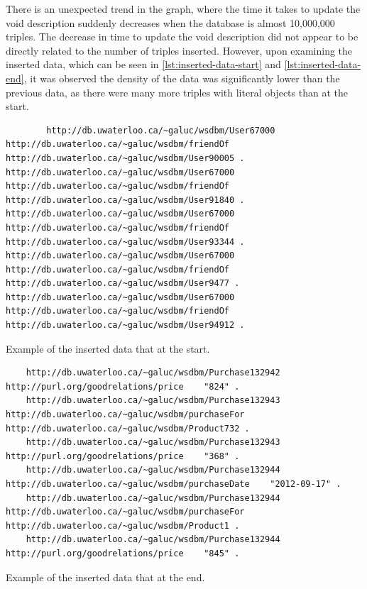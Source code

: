 There is an unexpected trend in the graph, where the time it takes to update the \gls{void} description suddenly decreases when the database is almost 10,000,000 triples. The decrease in time to update the \gls{void} description did not appear to be directly related to the number of triples inserted. However, upon examining the inserted data, which can be seen in \autoref{lst:inserted-data-start} and \autoref{lst:inserted-data-end}, it was observed the density of the data was significantly lower than the previous data, as there were many more triples with literal objects than at the start.

\begin{listing}
    \begin{verbatim}
        http://db.uwaterloo.ca/~galuc/wsdbm/User67000    http://db.uwaterloo.ca/~galuc/wsdbm/friendOf    http://db.uwaterloo.ca/~galuc/wsdbm/User90005 .
http://db.uwaterloo.ca/~galuc/wsdbm/User67000    http://db.uwaterloo.ca/~galuc/wsdbm/friendOf    http://db.uwaterloo.ca/~galuc/wsdbm/User91840 .
http://db.uwaterloo.ca/~galuc/wsdbm/User67000    http://db.uwaterloo.ca/~galuc/wsdbm/friendOf    http://db.uwaterloo.ca/~galuc/wsdbm/User93344 .
http://db.uwaterloo.ca/~galuc/wsdbm/User67000    http://db.uwaterloo.ca/~galuc/wsdbm/friendOf    http://db.uwaterloo.ca/~galuc/wsdbm/User9477 .
http://db.uwaterloo.ca/~galuc/wsdbm/User67000    http://db.uwaterloo.ca/~galuc/wsdbm/friendOf    http://db.uwaterloo.ca/~galuc/wsdbm/User94912 .
\end{verbatim}
    \caption{Example of the inserted data that at the start.}
    \label{lst:inserted-data-start}
\end{listing}

\begin{listing}
    \begin{verbatim}
    http://db.uwaterloo.ca/~galuc/wsdbm/Purchase132942    http://purl.org/goodrelations/price    "824" .
    http://db.uwaterloo.ca/~galuc/wsdbm/Purchase132943    http://db.uwaterloo.ca/~galuc/wsdbm/purchaseFor    http://db.uwaterloo.ca/~galuc/wsdbm/Product732 .
    http://db.uwaterloo.ca/~galuc/wsdbm/Purchase132943    http://purl.org/goodrelations/price    "368" .
    http://db.uwaterloo.ca/~galuc/wsdbm/Purchase132944    http://db.uwaterloo.ca/~galuc/wsdbm/purchaseDate    "2012-09-17" .
    http://db.uwaterloo.ca/~galuc/wsdbm/Purchase132944    http://db.uwaterloo.ca/~galuc/wsdbm/purchaseFor    http://db.uwaterloo.ca/~galuc/wsdbm/Product1 .
    http://db.uwaterloo.ca/~galuc/wsdbm/Purchase132944    http://purl.org/goodrelations/price    "845" .        
\end{verbatim}
    \caption{Example of the inserted data that at the end.}
    \label{lst:inserted-data-end}
\end{listing}

